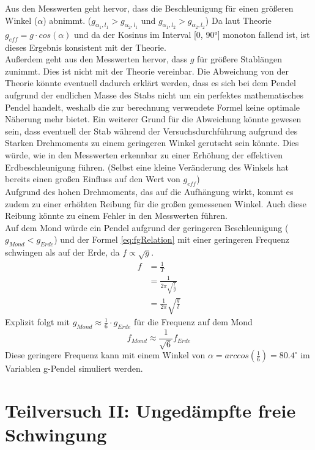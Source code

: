 \documentclass{report}
\begin{document}
Aus den Messwerten geht hervor, dass die Beschleunigung für einen größeren Winkel ($\alpha$) abnimmt. ($g_{\alpha_1, l_1} > g_{\alpha_2, l_1}$ und $g_{\alpha_1, l_2} > g_{\alpha_2, l_2}$)
Da laut Theorie $g_{eff} = g \cdot cos(\alpha)$ und da der Kosinus im Interval [0, 90°] monoton fallend ist, ist dieses Ergebnis konsistent mit der Theorie. \\
Außerdem geht aus den Messwerten hervor, dass $g$ für größere Stablängen zunimmt. Dies ist nicht mit der Theorie vereinbar.
Die Abweichung von der Theorie könnte eventuell dadurch erklärt werden, dass es sich bei dem Pendel aufgrund der endlichen Masse des Stabs nicht um ein perfektes mathematisches Pendel handelt,
weshalb die zur berechnung verwendete Formel keine optimale Näherung mehr bietet.
Ein weiterer Grund für die Abweichung könnte gewesen sein, dass eventuell der Stab während der Versuchsdurchführung aufgrund des Starken Drehmoments zu einem geringeren
Winkel gerutscht sein könnte. Dies würde, wie in den Messwerten erkennbar zu einer Erhöhung der effektiven Erdbeschleunigung führen. (Selbst eine kleine Veränderung des
Winkels hat bereits einen großen Einfluss auf den Wert von $g_{eff}$) \\
Aufgrund des hohen Drehmoments, das auf die Aufhängung wirkt, kommt es zudem zu einer erhöhten Reibung für die großen gemessenen Winkel. Auch diese Reibung 
könnte zu einem Fehler in den Messwerten führen.\\
Auf dem Mond würde ein Pendel aufgrund der geringeren Beschleunigung ($g_{Mond} < g_{Erde}$) und der Formel \ref{eq:fgRelation} mit einer geringeren Frequenz schwingen als auf der Erde, da $f \propto \sqrt{g}$.
\begin{equation}
    \begin{split}
        f &= \frac{1}{T} \\
          &= \frac{1}{2\pi \sqrt{\frac{l}{g}}} \\
          &= \frac{1}{2\pi} \sqrt{\frac{g}{l}}
    \end{split}
    \label{eq:fgRelation}
\end{equation}
Explizit folgt mit $g_{Mond} \approx \frac{1}{6} \cdot g_{Erde}$ für die Frequenz auf dem Mond
\begin{equation}
    f_{Mond} \approx \frac{1}{\sqrt{6}}f_{Erde}
\end{equation}
Diese geringere Frequenz kann mit einem Winkel von $\alpha = arccos(\frac{1}{6}) = 80.4^\circ$ im Variablen g-Pendel simuliert werden.

\newpage
\section{Teilversuch II: Ungedämpfte freie Schwingung}
\end{document}
